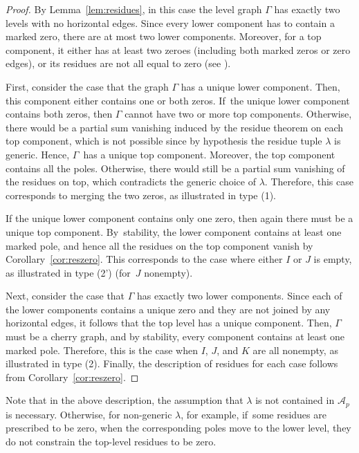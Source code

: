 \begin{proof}
By Lemma~\ref{lem:residues}, in this case the level graph $\Gamma$ has exactly two levels with no horizontal edges. Since every lower component has to contain a marked zero, there are at most two lower components.
Moreover, for a top component, it either has at least two zeroes (including both marked zeros or zero edges), or its residues are not all equal to zero (see \cite[Th.\,1.2(i)]{getaab}).

First, consider the case that the graph $\Gamma$ has a unique lower component. Then, this component either contains one or both zeros. If~the unique lower component contains both zeros, then $\Gamma$ cannot have two or more top components. Otherwise, there would be a partial sum vanishing induced by the residue theorem on each top component, which is not possible since by hypothesis the residue tuple $\lambda$ is generic. Hence, $\Gamma$~has a unique top component. Moreover, the top component contains all the poles. Otherwise, there would still be a partial sum vanishing of the residues on top, which contradicts the generic choice of $\lambda$. Therefore, this case corresponds to merging the two zeros, as illustrated in type (1).

If the unique lower component contains only one zero, then again there must be a unique top component. By~stability, the lower component contains at least one marked pole, and hence all the residues on the top component vanish by Corollary~\ref{cor:reszero}. This corresponds to the case where either $I$ or $J$ is empty, as illustrated in type (2') (for~$J$ nonempty).

Next, consider the case that $\Gamma$ has exactly two lower components. Since each of the lower components contains a unique zero and they are not joined by any horizontal edges, it follows that the top level has a unique component.
Then, $\Gamma$ must be a cherry graph, and by stability, every component contains at least one marked pole. Therefore, this is the case when $I$, $J$, and $K$ are all nonempty, as illustrated in type (2).
Finally, the description of residues for each case follows from Corollary~\ref{cor:reszero}.
\end{proof}

\begin{rmk}
Note that in the above description, the assumption that $\lambda$ is not contained in $\mathcal{A}_{p}$ is necessary. Otherwise, for non-generic $\lambda$, for example, if~some residues are prescribed to be zero, when the corresponding poles move to the lower level, they do not constrain the top-level residues to be zero.
\end{rmk}

